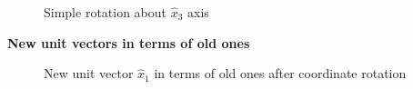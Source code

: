 \begin{figure}[h]
\begin{center}
\end{center}
\caption{Simple rotation about $\hat{x}_3$ axis}
\label{rotationofaxes2}
\end{figure}


{\bf New unit vectors in terms of old ones}

\begin{figure}[h]
\begin{center}
\end{center}
\caption{New unit vector $\hat{x}_1$ in terms of old ones after coordinate rotation}
\label{rotationofaxes3}
\end{figure}



